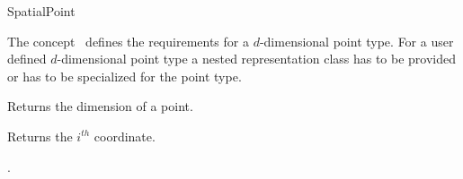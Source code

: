 

\begin{ccRefConcept}{SpatialPoint}


\ccDefinition
  
The concept \ccClassTemplateName\ defines the requirements for a 
$d$-dimensional point type.
For a user defined $d$-dimensional point type a nested representation class
 has to be provided or  has to be
specialized for the point type. 


\ccOperations

{Returns the dimension of a point.}

{Returns the $i^{th}$ coordinate.}

\ccHasModels

.


\end{ccRefConcept}


